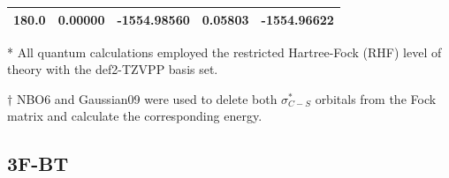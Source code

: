 \begin{table}[hbt!]
\begin{threeparttable}
\begin{tabular}{ccccc}
180.0 & 0.00000 & -1554.98560 & 0.05803 & -1554.96622 \\ \bottomrule
\end{tabular}
\begin{tablenotes}
\item[*] \footnotesize All quantum calculations employed the restricted Hartree-Fock (RHF) level of theory with the def2-TZVPP basis set.
\item[$\dagger$] \footnotesize NBO6 and Gaussian09 were used to delete both $\sigma^{*}_{C-S}$ orbitals from the Fock matrix and calculate the corresponding energy.
\end{tablenotes}
\end{threeparttable}
\end{table}

\clearpage
\subsection{3F-BT}

